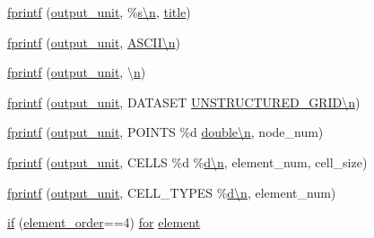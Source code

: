 \begin{DoxyCompactItemize}
\item 
\hyperlink{a00611_a259aa9c1a1010c6a8017d7f325769ed0}{fprintf} (\hyperlink{a00614_a21b113ecd24e6ae8a92fa4a149ad8701}{output\+\_\+unit}, \textquotesingle{}\%\hyperlink{a00623_a781a04ab095280f838ff3eb0e51312e0}{s\textbackslash{}n}\textquotesingle{}, \hyperlink{a00617_a051e403214cb6872ad3fe4e50302a6ee}{title})
\item 
\hyperlink{a00611_acc97c3c352b46085e3af0ea564c84e11}{fprintf} (\hyperlink{a00614_a21b113ecd24e6ae8a92fa4a149ad8701}{output\+\_\+unit}, \textquotesingle{}\hyperlink{a00623_a781a04ab095280f838ff3eb0e51312e0}{A\+S\+C\+I\+I\textbackslash{}n}\textquotesingle{})
\item 
\hyperlink{a00611_a1d7f87179f244d0e1654156ccf4b0bb4}{fprintf} (\hyperlink{a00614_a21b113ecd24e6ae8a92fa4a149ad8701}{output\+\_\+unit}, \textquotesingle{}\textbackslash{}\hyperlink{a00623_a781a04ab095280f838ff3eb0e51312e0}{n}\textquotesingle{})
\item 
\hyperlink{a00611_a0191d5a3d7a9ef1af586466fc99349c1}{fprintf} (\hyperlink{a00614_a21b113ecd24e6ae8a92fa4a149ad8701}{output\+\_\+unit}, \textquotesingle{}D\+A\+T\+A\+S\+ET \hyperlink{a00623_a781a04ab095280f838ff3eb0e51312e0}{U\+N\+S\+T\+R\+U\+C\+T\+U\+R\+E\+D\+\_\+\+G\+R\+I\+D\textbackslash{}n}\textquotesingle{})
\item 
\hyperlink{a00611_a16ba598da8d8c1c1ed5524dd0d28be3b}{fprintf} (\hyperlink{a00614_a21b113ecd24e6ae8a92fa4a149ad8701}{output\+\_\+unit}, \textquotesingle{}P\+O\+I\+N\+TS \%d \hyperlink{a00623_a781a04ab095280f838ff3eb0e51312e0}{double\textbackslash{}n}\textquotesingle{}, node\+\_\+num)
\item 
\hyperlink{a00611_a5c115be6dac9553bfb8bfb7c8acc7fb6}{fprintf} (\hyperlink{a00614_a21b113ecd24e6ae8a92fa4a149ad8701}{output\+\_\+unit}, \textquotesingle{}C\+E\+L\+LS \%d \%\hyperlink{a00623_a781a04ab095280f838ff3eb0e51312e0}{d\textbackslash{}n}\textquotesingle{}, element\+\_\+num, cell\+\_\+size)
\item 
\hyperlink{a00611_a6d260fc6024e5c8efb69ca2aa9148daa}{fprintf} (\hyperlink{a00614_a21b113ecd24e6ae8a92fa4a149ad8701}{output\+\_\+unit}, \textquotesingle{}C\+E\+L\+L\+\_\+\+T\+Y\+P\+ES \%\hyperlink{a00623_a781a04ab095280f838ff3eb0e51312e0}{d\textbackslash{}n}\textquotesingle{}, element\+\_\+num)
\item 
\hyperlink{a00611_a378f77eb1cc67d215cfc19277889f140}{if} (\hyperlink{a00611_aa77ee84ffb15118601acbd018f243edc}{element\+\_\+order}==4) \hyperlink{a00623_ad1e7380d51df1e0043d24d3c8a860e0a}{for} \hyperlink{a00611_a4998e7f4989562d1ed06579e07265c30}{element}

\end{DoxyCompactItemize}
